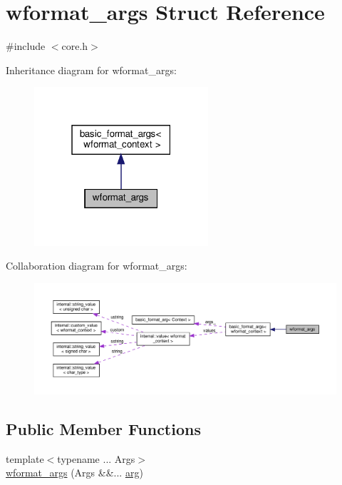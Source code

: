\hypertarget{structwformat__args}{}\section{wformat\+\_\+args Struct Reference}
\label{structwformat__args}


{\ttfamily \#include $<$core.\+h$>$}



Inheritance diagram for wformat\+\_\+args\+:
\nopagebreak
\begin{figure}[H]
\begin{center}
\leavevmode
\includegraphics[width=183pt]{structwformat__args__inherit__graph}
\end{center}
\end{figure}


Collaboration diagram for wformat\+\_\+args\+:
\nopagebreak
\begin{figure}[H]
\begin{center}
\leavevmode
\includegraphics[width=350pt]{structwformat__args__coll__graph}
\end{center}
\end{figure}
\subsection*{Public Member Functions}
\begin{DoxyCompactItemize}
\item 
{\footnotesize template$<$typename ... Args$>$ }\\\hyperlink{structwformat__args_ab10e8e30aa7400efdc898c84a8130930}{wformat\+\_\+args} (Args \&\&... \hyperlink{core_8h_ab87859023d64d26171b1e74a3d0c3b99}{arg})
\end{DoxyCompactItemize}
